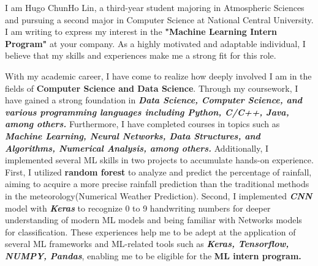 
I am Hugo ChunHo Lin, a third-year student majoring in Atmospheric Sciences and pursuing a second major in Computer Science at National Central University. I am writing to express my interest in the \textbf{"Machine Learning Intern Program"} at your company. As a highly motivated and adaptable individual, I believe that my skills and experiences make me a strong fit for this role.

With my academic career, I have come to realize how deeply involved I am in the fields of \textbf{Computer Science and Data Science}. Through my coursework, I have gained a strong foundation in \textit{\textbf{Data Science, Computer Science, and various programming languages including Python, C/C++, Java, among others.}} Furthermore, I have completed courses in topics such as \textit{\textbf{Machine Learning, Neural Networks, Data Structures, and Algorithms, Numerical Analysis, among others.}}
Additionally, I implemented several ML skills in two projects to accumulate hands-on experience. 
First, I utilized \textbf{random forest} to analyze and predict the percentage of rainfall, aiming to acquire a more precise rainfall prediction than the traditional methods in the meteorology(Numerical Weather Prediction). 
Second, I implemented \textit{\textbf{CNN}} model with \textit{\textbf{Keras}} to recognize 0 to 9 handwriting numbers for deeper understanding of modern ML models and being familiar with Networks models for classification. 
These experiences help me to be adept at the application of several ML frameworks and ML-related tools such as \textbf{\textit{Keras, Tensorflow, NUMPY, Pandas}}, enabling me to be eligible for the \textbf{ML intern program.} 

